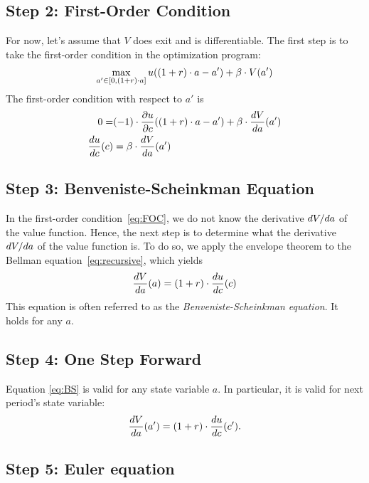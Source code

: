 \documentclass[letterpaper,12pt,leqno]{article}
\begin{document}
\subsection{Step 2: First-Order Condition}

For now, let's assume that $V$ does exit and is differentiable. The first step is to take the first-order condition in the optimization program:
\begin{equation*}
\max_{a'\in[0,(1+r)\cdot a]} u((1+r)\cdot a-a')+\b \cdot V(a')
\end{equation*}
The first-order condition with respect to $a'$ is
\begin{align}
0=&(-1)\cdot \frac{\partial u}{\partial c}((1+r)\cdot a-a')+\beta \cdot \frac{d V}{d a}(a')\nonumber\\
\frac{d u}{d c}(c)&=\beta \cdot \frac{d V}{d a}(a')\label{eq:FOC}
\end{align}

\subsection{Step 3: Benveniste-Scheinkman Equation}

In the first-order condition~\eqref{eq:FOC}, we do not know  the derivative $d V/d a$ of the value function. Hence, the next step is to determine what the derivative $d V/d a$ of the value function is. To do so, we apply the envelope theorem to the Bellman equation~\eqref{eq:recursive}, which yields
\begin{equation}
 \frac{d V}{d a}(a)=(1+r)\cdot \frac{d u}{d c}(c) \label{eq:BS}
\end{equation}
This equation is often referred to as the \textit{Benveniste-Scheinkman equation}. It holds for any $a$.

\subsection{Step 4: One Step Forward}

Equation \eqref{eq:BS} is valid for any state variable $a$. In particular, it is valid for next period's state variable:
\begin{equation}
\frac{d V}{d a}(a')=(1+r)\cdot \frac{d u}{d c}(c')\label{eq:BS2}.
\end{equation}

\subsection{Step 5: Euler equation}
\end{document}
